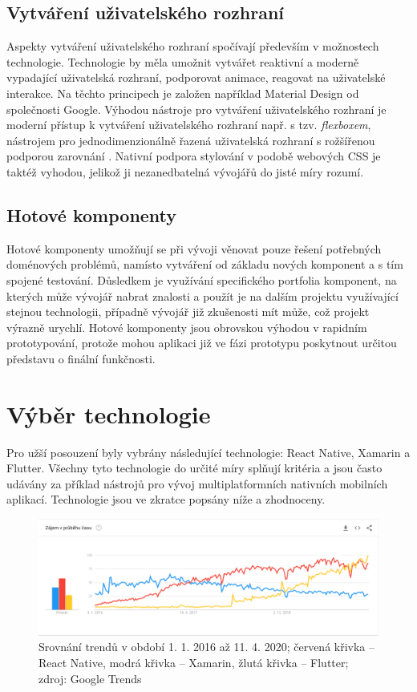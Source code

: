 \subsection{Vytváření uživatelského rozhraní}

Aspekty vytváření uživatelského rozhraní spočívají především v možnostech technologie. Technologie by měla umožnit vytvářet reaktivní a moderně vypadající uživatelská rozhraní, podporovat animace, reagovat na uživatelské interakce. Na těchto principech je založen například Material Design od společnosti Google. Výhodou nástroje pro vytváření uživatelského rozhraní je moderní přístup k vytváření uživatelského rozhraní např. s tzv. \emph{flexboxem}, nástrojem pro jednodimenzionálně řazená uživatelská rozhraní s rožšířenou podporou zarovnání \cite{FlexboxMDN}. Nativní podpora stylování v podobě webových CSS je taktéž vyhodou, jelikož ji nezanedbatelná vývojářů do jisté míry rozumí.

\subsection{Hotové komponenty}

Hotové komponenty umožňují se při vývoji věnovat pouze řešení potřebných doménových problémů, namísto vytváření od základu nových komponent a s tím spojené testování. Důsledkem je využívání specifického portfolia komponent, na kterých může vývojář nabrat znalosti a použít je na dalším projektu využívající stejnou technologii, případně vývojář již zkušenosti mít může, což projekt výrazně urychlí. Hotové komponenty jsou obrovskou výhodou v rapidním prototypování, protože mohou aplikaci již ve fázi prototypu poskytnout určitou představu o finální funkčnosti.

\section{Výběr technologie}

Pro užší posouzení byly vybrány následující technologie: React Native, Xamarin a Flutter. Všechny tyto technologie do určité míry splňují kritéria a jsou často udávány za příklad nástrojů pro vývoj multiplatformních nativních mobilních aplikací. Technologie jsou ve zkratce popsány níže a zhodnoceny.

\begin{figure}[h]
	\includegraphics[width=\linewidth]{img/google_trends.png}
	\caption[Srovnání trendů technologií pro mobilní vývoj]{Srovnání trendů v období 1. 1. 2016 až 11. 4. 2020; červená křivka -- React Native, modrá křivka -- Xamarin, žlutá křivka -- Flutter; zdroj: Google Trends}
	\label{fig:gtrends}
\end{figure}

